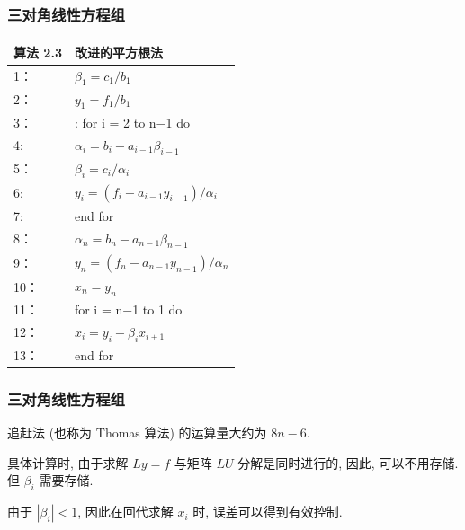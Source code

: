 \documentclass[notheorems,serif]{beamer}
\begin{document}
\begin{frame}
\frametitle{三对角线性方程组}
\begin{table}  
	\begin{tabular*}{16cm}{ll}  
		\hline  
		算法 2.3 &改进的平方根法\\  
		\hline  
		1：   & $\beta_{1}=c_{1} / b_{1}$\\  
		2：   & $y_{1}=f_{1} / b_{1}$\\
		3：   & : for i = 2 to n−1 do \\
		4:    & \qquad $\alpha_{i}=b_{i}-a_{i-1} \beta_{i-1}$\\
		5：   & \qquad $\beta_{i}=c_{i} / \alpha_{i}$\\
		6:    & \qquad $y_{i}=\left(f_{i}-a_{i-1} y_{i-1}\right) / \alpha_{i}$\\
		7:   & end for\\
		8：   & $\alpha_{n}=b_{n}-a_{n-1} \beta_{n-1}$ \\
		9：   & $y_{n}=\left(f_{n}-a_{n-1} y_{n-1}\right) / \alpha_{n}$\\
		10：  & $x_{n}=y_{n}$\\
		11：  & for i = n−1 to 1 do\\
		12：  & \qquad $x_{i}=y_{i}-\beta_{i} x_{i+1}$\\
		13：  & end for\\
		\hline  
	\end{tabular*}  
\end{table}
\end{frame}

\begin{frame}
\frametitle{三对角线性方程组}
{\red{$\dagger$}}追赶法 (也称为 Thomas 算法) 的运算量大约为 $8n − 6$.



{\red{$\dagger$}}具体计算时, 由于求解 $Ly = f$ 与矩阵 $LU$ 分解是同时进行的, 因此,
 可以不用存储. 但 $\beta_i$ 需要存储.



{\red{$\dagger$}}由于 $|\beta_i| < 1$, 因此在回代求解 $x_i$ 时, 误差可以得到有效控制.
\end{frame}
\end{document}
